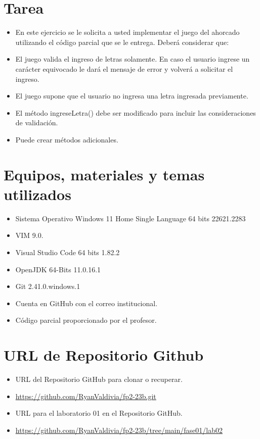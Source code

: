 \documentclass{article}
\begin{document}
	\section{Tarea}
	\begin{itemize}
		\subsection{Actividad: Juego del Ahorcado}
			\item En este ejercicio se le solicita a usted implementar el juego del ahorcado utilizando el código parcial que se le entrega. Deberá considerar que:
			\item El juego valida el ingreso de letras solamente. En caso el usuario ingrese un carácter equivocado
le dará el mensaje de error y volverá a solicitar el ingreso.
			\item El juego supone que el usuario no ingresa una letra ingresada previamente.
			\item El método ingreseLetra() debe ser modificado para incluir las consideraciones de validación.
			\item Puede crear métodos adicionales.
	\end{itemize}
		
	\section{Equipos, materiales y temas utilizados}
	\begin{itemize}
		\item Sistema Operativo Windows 11 Home Single Language 64 bits 22621.2283
		\item VIM 9.0.
		\item Visual Studio Code 64 bits 1.82.2
		\item OpenJDK 64-Bits 11.0.16.1
		\item Git 2.41.0.windows.1
		\item Cuenta en GitHub con el correo institucional. 
		\item Código parcial proporcionado por el profesor.
	\end{itemize}
	
	\section{URL de Repositorio Github}
	\begin{itemize}
		\item URL del Repositorio GitHub para clonar o recuperar.
		\item \url{https://github.com/RyanValdivia/fp2-23b.git}
		\item URL para el laboratorio 01 en el Repositorio GitHub.
		\item \url{https://github.com/RyanValdivia/fp2-23b/tree/main/fase01/lab02}
	\end{itemize}
	
\end{document}

